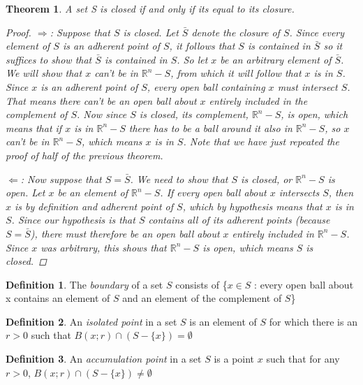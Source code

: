 \documentclass[11pt,a4paper]{report}
\theoremstyle{plain}
\newtheorem{thm}{Theorem}[section]
\theoremstyle{definition}
\newtheorem{defn}{Definition}[section]
\theoremstyle{remark}
\begin{document}
\begin{thm}
A set S is closed if and only if its equal to its closure. 
\begin{proof}
$\Rightarrow$:
Suppose that $S$ is closed. Let $\bar{S}$ denote the closure of $S$. Since every element of $S$ is an adherent point of $S$, it follows that $S$ is contained in $\bar{S}$ so it suffices to show that $\bar{S}$ is contained in $S$.  So let $x$ be an arbitrary element of $\bar{S}$. We will show that $x$ can't be in $\mathbb{R}^n - S$, from which it will follow that $x$ is in $S$. Since $x$ is an adherent point of $S$, every open ball containing $x$ must intersect $S$.  That means there can't be an open ball about $x$ entirely included in the complement of $S$.  Now since $S$ is closed, its complement, $\mathbb{R}^n - S$, is open, which means that if $x$ is in $\mathbb{R}^n - S$ there has to be a ball around it also in $\mathbb{R}^n - S$, so $x$ can't be in $\mathbb{R}^n - S$, which means $x$ is in $S$.  Note that we have just repeated the proof of half of the previous theorem.

$\Leftarrow$:
Now suppose that $S = \bar{S}$.  We need to show that $S$ is closed, or $\mathbb{R}^n - S$ is open.  Let $x$ be an element of $\mathbb{R}^n - S$.  If every open ball about $x$ intersects $S$, then $x$ is by definition and adherent point of $S$, which by hypothesis means that $x$ is in $S$. Since our hypothesis is that $S$ contains all of its adherent points (because $S = \bar{S}$), there must therefore be an open ball about $x$ entirely included in $\mathbb{R}^n - S$.  Since $x$ was arbitrary, this shows that $\mathbb{R}^n - S$ is open, which means $S$ is closed.
\end{proof}
\end{thm}

\begin{defn}
The \textit{boundary} of a set $S$ consists of \{$x \in S$ : every open ball about x contains an element of $S$ and an element of the complement of $S$\}
\end{defn}

\begin{defn}
An \textit{isolated point} in a set $S$ is an element of $S$ for which there is an $r>0$ such that $B(x;r) \cap (S - \{x\}) = \emptyset$
\end{defn}

\begin{defn}
An \textit{accumulation point} in a set $S$ is a point $x$ such that for any $r>0$, $B(x;r) \cap (S - \{x\}) \neq \emptyset$
\end{defn}
\end{document}
